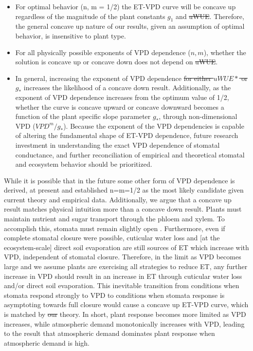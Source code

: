 \documentclass[hess, manuscript]{copernicus}
\providecommand{\DIFaddtex}[1]{{\protect\color{blue}\uwave{#1}}} %
\providecommand{\DIFdeltex}[1]{{\protect\color{red}\sout{#1}}}                      %
\providecommand{\DIFaddbegin}{} %
\providecommand{\DIFaddend}{} %
\providecommand{\DIFdelbegin}{} %
\providecommand{\DIFdelend}{} %
\providecommand{\DIFadd}[1]{\texorpdfstring{\DIFaddtex{#1}}{#1}} %
\providecommand{\DIFdel}[1]{\texorpdfstring{\DIFdeltex{#1}}{}} %
\begin{document}
 \begin{itemize}
  \item For optimal behavior (n, m = 1/2) the ET-VPD curve will be
    concave up regardless of the magnitude of the plant constants
    $g_1$ and \DIFdelbegin \DIFdel{uWUE}\DIFdelend \DIFaddbegin \DIFadd{$uWUE$}\DIFaddend . Therefore, the general concave up nature of our
    results, given an assumption of optimal behavior, is insensitive
    to plant type.
  \item For all physically possible exponents of VPD dependence ($n,
    m$), whether the solution is concave up or concave down does not
    depend on \DIFdelbegin \DIFdel{uWUE}\DIFdelend \DIFaddbegin \DIFadd{$uWUE$}\DIFaddend .
  \item In general, increasing the exponent of VPD dependence
    \DIFdelbegin \DIFdel{for
    either $uWUE*$ or $g_*$ }\DIFdelend increases the likelihood of a concave down result. Additionally, as
    the exponent of VPD dependence increases from the optimum value of
    1/2, whether the curve is concave upward or concave downward
    becomes a function of the plant specific slope parameter $g_*$,
    through non-dimensional VPD ($VPD^m/g_*$). Because the exponent of
    the VPD dependencies is capable of altering the fundamental shape
    of ET-VPD dependence, future research investment in understanding
    the exact VPD dependence of stomatal conductance, and further
    reconciliation of empirical and theoretical stomatal and
    ecosystem behavior should be prioritized.
 \end{itemize}
\DIFdelbegin %

\DIFdelend While it is possible that in the future some other form of
VPD dependence is derived, at present \cite{MEDLYN_2011} and
\cite{Zhou_2014} \DIFaddbegin \DIFadd{firmly }\DIFaddend established n=m=1/2 as the most likely
candidate given current theory and empirical data. Additionally, we
argue that a concave up result matches physical intuition more than a
concave down result. Plants must maintain nutrient and sugar transport
through the phloem and xylem. To accomplish this, stomata must remain
slightly open \citep{De_2013, Nikinmaa_2013, Ryan_2014}. Furthermore,
even if complete stomatal closure were possible, cuticular water loss
and [at the ecosystem-scale] direct soil evaporation are still sources
of ET which increase with VPD, independent of stomatal
closure. Therefore, in the limit as VPD becomes large and we assume
plants are exercising all strategies to reduce ET, any further increase
in VPD should result in an increase in ET through cuticular water loss
and/or direct soil evaporation. This inevitable transition from
conditions when stomata respond strongly to VPD to conditions when
stomata response is asymptoting towards full closure would cause a
concave up ET-VPD curve, which is matched by \DIFdelbegin \DIFdel{our }\DIFdelend \DIFaddbegin \DIFadd{the }\DIFaddend theory. In short,
plant response becomes more limited as VPD increases, while
atmospheric demand monotonically increases with VPD, leading to the
 result that atmospheric demand dominates plant response when
atmospheric demand is high.
\end{document}
